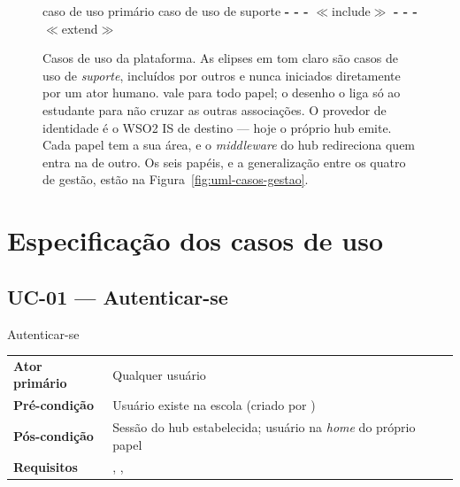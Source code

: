 \begin{figure}[H]
{}
\begin{legendadiag}
 caso de uso primário \quad
{} caso de uso de suporte \quad
\textcolor{unooGreen}{\textbf{- - -}} $\ll$include$\gg$ \quad
\textcolor{unooOrange}{\textbf{- - -}} $\ll$extend$\gg$
\end{legendadiag}
\caption[Casos de uso da plataforma]{Casos de uso da plataforma. As elipses em
  tom claro são casos de uso de \emph{suporte}, incluídos por outros e nunca
  iniciados diretamente por um ator humano.  vale para todo papel; o
  desenho o liga só ao estudante para não cruzar as outras associações. O
  provedor de identidade é o WSO2 IS de destino --- hoje o próprio hub emite.
  Cada papel tem a sua área, e o \emph{middleware} do hub redireciona quem entra
  na de outro. Os seis papéis, e a generalização entre os quatro de gestão,
  estão na Figura~\ref{fig:uml-casos-gestao}.}
\label{fig:casos-de-uso}
\end{figure}

\section{Especificação dos casos de uso}

\subsection{UC-01 --- Autenticar-se}

\begin{especificacao}{ Autenticar-se}
\begin{tabularx}{\linewidth}{@{}L{28mm}X@{}}
\textbf{Ator primário} & Qualquer usuário\\
\textbf{Pré-condição} & Usuário existe na escola (criado por )\\
\textbf{Pós-condição} & Sessão do hub estabelecida; usuário na \emph{home} do
  próprio papel\\
\textbf{Requisitos} & , , \\
\end{tabularx}
\end{especificacao}

